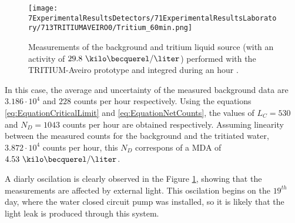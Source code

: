 \begin{figure}[h]
\centering
\texttt{[image: 7ExperimentalResultsDetectors/71ExperimentalResultsLaboratory/713TRITIUMAVEIRO0/Tritium\_60min.png]}
\caption{Measurements of the background and tritium liquid source (with an activity of $29.8~\kilo\becquerel/\liter$) performed with the TRITIUM-Aveiro prototype and integred during an hour \cite{ExperimentalPaperCarlos}.\label{fig:Tritium60min}}
\end{figure}

In this case, the average and uncertainty of the measured background data are $3.186 \cdot{} 10^{4}$ and $228$ counts per hour respectively. Using the equations \ref{eq:EquationCriticalLimit} and \ref{eq:EquationNetCounts}, the values of $L_C=530$ and $N_D=1043$ counts per hour are obtained respectively. Assuming linearity between the measured counts for the background and the tritiated water, $3.872\cdot{}10^4$ counts per hour, this $N_D$ correspons of a MDA of $4.53~\kilo\becquerel/\liter$.

A diarly oscilation is clearly observed in the Figure \ref{fig:Tritium60min}, showing that the measurements are affected by external light. This oscilation begins on the $19^{th}$ day, where the water closed circuit pump was installed, so it is likely that the light leak is produced through this system.







